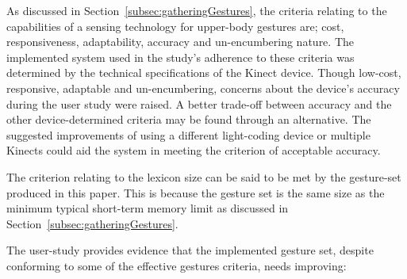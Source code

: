 \documentclass[link]{IWCOMP}
\begin{document}
As discussed in Section~\ref{subsec:gatheringGestures}, the criteria relating to the capabilities of a sensing technology for upper-body gestures are; cost, responsiveness, adaptability, accuracy and un-encumbering nature.
The implemented system used in the study's adherence to these criteria was determined by the technical specifications of the Kinect device.
Though low-cost, responsive, adaptable and un-encumbering, concerns about the device's accuracy during the user study were raised.
A better trade-off between accuracy and the other device-determined criteria may be found through an alternative.
The suggested improvements of using a different light-coding device or multiple Kinects could aid the system in meeting the criterion of acceptable accuracy.

The criterion relating to the lexicon size can be said to be met by the gesture-set produced in this paper.
This is because the gesture set is the same size as the minimum typical short-term memory limit as discussed in Section~\ref{subsec:gatheringGestures}.

The user-study provides evidence that the implemented gesture set, despite conforming to some of the effective gestures criteria, needs improving:
\end{document}
